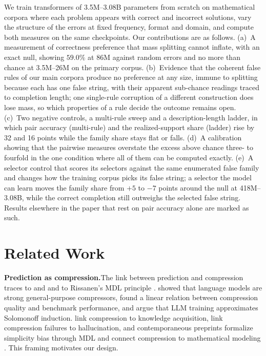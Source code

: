 \documentclass{article}
\begin{document}
We train transformers of 3.5M--3.08B parameters from scratch on mathematical corpora where each problem appears with correct and incorrect solutions, vary the structure of the errors at fixed frequency, format and domain, and compute both measures on the same checkpoints. Our contributions are as follows. (a)~A measurement of correctness preference that mass splitting cannot inflate, with an exact null, showing $59.0\%$ at 86M against random errors and no more than chance at 3.5M--26M on the primary corpus. (b)~Evidence that the coherent false rules of our main corpora produce no preference at any size, immune to splitting because each has one false string, with their apparent sub-chance readings traced to completion length; one single-rule corruption of a different construction does lose mass, so which properties of a rule decide the outcome remains open. (c)~Two negative controls, a multi-rule sweep and a description-length ladder, in which pair accuracy (multi-rule) and the realized-support share (ladder) rise by 32 and 16 points while the family share stays flat or falls. (d)~A calibration showing that the pairwise measures overstate the excess above chance three- to fourfold in the one condition where all of them can be computed exactly. (e)~A selector control that scores its selectors against the same enumerated false family and changes how the training corpus picks its false string; a selector the model can learn moves the family share from $+5$ to $-7$ points around the null at 418M--3.08B, while the correct completion still outweighs the selected false string. Results elsewhere in the paper that rest on pair accuracy alone are marked as such.

\section{Related Work}

\textbf{Prediction as compression.}\quad The link between prediction and compression traces to \citet{shannon1948mathematical} and \citet{solomonoff1964formal} and to Rissanen's MDL principle \citep{rissanen1978modeling,grunwald2007minimum}. \citet{deletang2024language} showed that language models are strong general-purpose compressors, \citet{huang2024compression} found a linear relation between compression quality and benchmark performance, and \citet{wan2025large} argue that LLM training approximates Solomonoff induction. \citet{pan2025understanding} link compression to knowledge acquisition, \citet{chlon2025predictable} link compression failures to hallucination, and contemporaneous preprints formalize simplicity bias through MDL \citep{marty2026compression} and connect compression to mathematical modeling \citep{aksenov2026compression}. This framing motivates our design.
\end{document}
